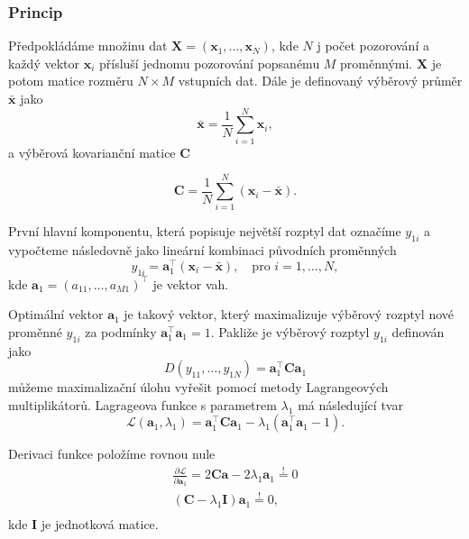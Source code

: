 \subsubsection{Princip}

Předpokládáme množinu dat $\mathbf{X} = (\bm{x}_1, \ldots, \bm{x}_N )$, kde $N$ j počet pozorování a každý vektor $\bm{x}_i$ přísluší jednomu pozorování popsanému $M$ proměnnými. $\mathbf{X}$ je potom matice rozměru $N\times M$ vstupních dat. Dále je definovaný výběrový průměr $\bar{\bm{x}}$ jako
\begin{equation}
    \bar{\bm{x}} = \frac{1}{N} \sum_{i=1}^{N} \bm{x}_i,
\end{equation}
a výběrová kovarianční matice $\mathbf{C}$

\begin{equation}
    \mathbf{\mathbf{C}} = \frac{1}{N} \sum_{i=1}^{N} (\bm{x}_i - \bar{\bm{x}}).
\end{equation}

První hlavní komponentu, která popisuje největší rozptyl dat označíme $y_{1i}$ a vypočteme následovně jako lineární kombinaci původních proměnných
\begin{equation}
    y_{1i} = \bm{a}_1^\top (\bm{x}_i - \bar{\bm{x}}), \quad \mbox{pro } i=1,\ldots,N,
\end{equation}
kde $\bm{a}_1 = (a_{11}, \ldots, a_{M1})^\top $ je vektor vah. 

Optimální vektor $\bm{a}_1$ je takový vektor, který maximalizuje výběrový rozptyl nové proměnné $y_{1i}$ za podmínky $\bm{a}_1^\top\bm{a}_1 = 1$. Pakliže je výběrový rozptyl $y_{1i}$ definován jako 
\begin{equation}
    D(y_{11}, \ldots, y_{1N}) = \bm{a}_1^\top \mathbf{C} \bm{a}_1
\end{equation}
můžeme maximalizační úlohu vyřešit pomocí metody Lagrangeových multiplikátorů. Lagrageova funkce s parametrem $\lambda_1$ má následující tvar
\begin{equation}
    \mathcal{L}(\bm{a}_1, \lambda_1) = \bm{a}_1^\top \mathbf{C} \bm{a}_1 - \lambda_1(\bm{a}_1^\top\bm{a}_1 - 1).
\end{equation}

Derivaci funkce položíme rovnou nule 
\begin{align*}
    \frac{\partial \mathcal{L}}{\partial \bm{a}_1}  = 2 \mathbf{C} \bm{a} - 2\lambda_1 \bm{a}_1 \overset{!}{=}  0 \\
    (\mathbf{C} - \lambda_1 \mathbf{I} ) \bm{a}_1 \overset{!}{=}  0,  \\
\end{align*}
kde $\mathbf{I}$ je jednotková matice.

